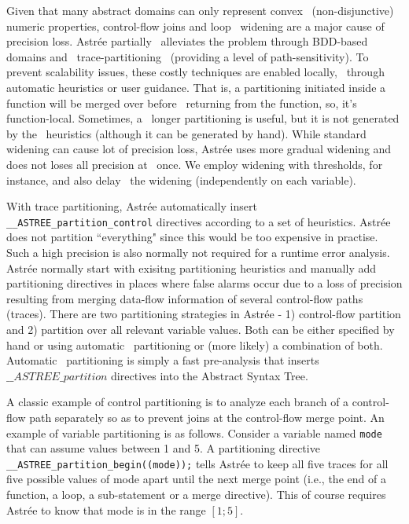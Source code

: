 
%
%
%
Given that many abstract domains can only represent convex  
(non-disjunctive) numeric properties, control-flow joins and loop  
widening are a major cause of precision loss.  Astr{\'e}e partially  
alleviates the problem through BDD-based domains and 
trace-partitioning~\cite{DBLP:journals/toplas/RivalM07}
(providing a level of path-sensitivity). 
To prevent scalability issues, these costly techniques are enabled locally, 
through automatic heuristics or user guidance.  That is, a partitioning 
initiated inside a function will be merged over before  
returning from the function, so, it's function-local. Sometimes, a  
longer partitioning is useful, but it is not generated by the  
heuristics (although it can be generated by hand).  While standard 
widening can cause lot of precision loss, Astr{\'e}e 
uses more gradual widening and does not loses all precision at  
once.  We employ widening with thresholds, for instance, and also delay  
the widening (independently on each variable).  


With trace partitioning, Astr{\'e}e automatically insert 
\texttt{\_\_ASTREE\_partition\_control} directives according to a set of 
heuristics.  Astr{\'e}e does not partition ``everything" since this would 
be too expensive in practise. Such a high precision is also normally not 
required for a runtime error analysis. Astr{\'e}e normally start with exisitng 
partitioning heuristics and manually add partitioning directives in places 
where false alarms occur due to a loss of precision resulting from merging 
data-flow information of several control-flow paths (traces).
There are two partitioning strategies in Astr{\'e}e - 
1) control-flow partition and 2) partition over all relevant variable values.
Both can be either specified by hand or using automatic  
partitioning or (more likely) a combination of both. Automatic  
partitioning is simply a fast pre-analysis that inserts  
$\_\_ASTREE\_partition$ directives into the Abstract Syntax Tree.

A classic example of control partitioning is to analyze each branch of a 
control-flow path separately so as to prevent joins at the control-flow merge 
point.  An example of variable partitioning is as follows. Consider a variable 
named \texttt{mode} that can assume values between 1 and 5.  A partitioning directive 
\texttt{\_\_ASTREE\_partition\_begin((mode));} tells Astr{\'e}e to keep all 
five traces for all five possible values of mode apart 
until the next merge point (i.e., the end of a function, a loop, a sub-statement 
or a merge directive). This of course requires Astr{\'e}e to know that mode is 
in the range $[1;5]$.


